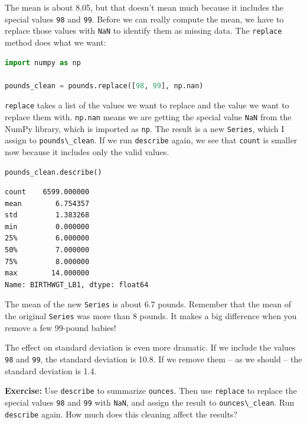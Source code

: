 \documentclass[
]{book}
\newcommand{\passthrough}[1]{#1}
\begin{document}
The mean is about 8.05, but that doesn't mean much because it includes
the special values \passthrough{\lstinline!98!} and
\passthrough{\lstinline!99!}. Before we can really compute the mean, we
have to replace those values with \passthrough{\lstinline!NaN!} to
identify them as missing data. The \passthrough{\lstinline!replace!}
method does what we want:

\begin{lstlisting}[language=Python]
import numpy as np

pounds_clean = pounds.replace([98, 99], np.nan)
\end{lstlisting}

\passthrough{\lstinline!replace!} takes a list of the values we want to
replace and the value we want to replace them with.
\passthrough{\lstinline!np.nan!} means we are getting the special value
\passthrough{\lstinline!NaN!} from the NumPy library, which is imported
as \passthrough{\lstinline!np!}. The result is a new
\passthrough{\lstinline!Series!}, which I assign to
\passthrough{\lstinline!pounds\_clean!}. If we run
\passthrough{\lstinline!describe!} again, we see that
\passthrough{\lstinline!count!} is smaller now because it includes only
the valid values.

\begin{lstlisting}[language=Python]
pounds_clean.describe()
\end{lstlisting}

\begin{lstlisting}
count    6599.000000
mean        6.754357
std         1.383268
min         0.000000
25%         6.000000
50%         7.000000
75%         8.000000
max        14.000000
Name: BIRTHWGT_LB1, dtype: float64
\end{lstlisting}

The mean of the new \passthrough{\lstinline!Series!} is about 6.7
pounds. Remember that the mean of the original
\passthrough{\lstinline!Series!} was more than 8 pounds. It makes a big
difference when you remove a few 99-pound babies!

The effect on standard deviation is even more dramatic. If we include
the values \passthrough{\lstinline!98!} and
\passthrough{\lstinline!99!}, the standard deviation is 10.8. If we
remove them -- as we should -- the standard deviation is 1.4.

\textbf{Exercise:} Use \passthrough{\lstinline!describe!} to summarize
\passthrough{\lstinline!ounces!}. Then use
\passthrough{\lstinline!replace!} to replace the special values
\passthrough{\lstinline!98!} and \passthrough{\lstinline!99!} with
\passthrough{\lstinline!NaN!}, and assign the result to
\passthrough{\lstinline!ounces\_clean!}. Run
\passthrough{\lstinline!describe!} again. How much does this cleaning
affect the results?
\end{document}
